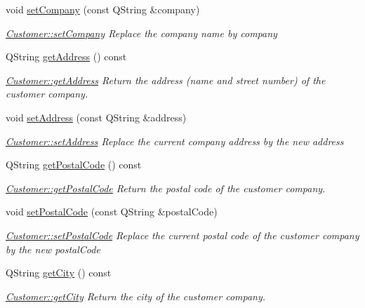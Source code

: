 \begin{DoxyCompactItemize}
void \hyperlink{classCustomer_a9d13cc3ad8464df4211da10213821fcc}{set\+Company} (const Q\+String \&company)
\begin{DoxyCompactList}\small\item\em \hyperlink{classCustomer_a9d13cc3ad8464df4211da10213821fcc}{Customer\+::set\+Company} Replace the company name by {\itshape company} \end{DoxyCompactList}\item 
Q\+String \hyperlink{classCustomer_af3e348865143342ad9c67981eb61e0c8}{get\+Address} () const 
\begin{DoxyCompactList}\small\item\em \hyperlink{classCustomer_af3e348865143342ad9c67981eb61e0c8}{Customer\+::get\+Address} Return the address (name and street number) of the customer company. \end{DoxyCompactList}\item 
void \hyperlink{classCustomer_addd0675e408a13f6ab95ec5bd5a3a13b}{set\+Address} (const Q\+String \&address)
\begin{DoxyCompactList}\small\item\em \hyperlink{classCustomer_addd0675e408a13f6ab95ec5bd5a3a13b}{Customer\+::set\+Address} Replace the current company address by the new {\itshape address} \end{DoxyCompactList}\item 
Q\+String \hyperlink{classCustomer_a39073588f2d7669b12a8ecc33b3c4224}{get\+Postal\+Code} () const 
\begin{DoxyCompactList}\small\item\em \hyperlink{classCustomer_a39073588f2d7669b12a8ecc33b3c4224}{Customer\+::get\+Postal\+Code} Return the postal code of the customer company. \end{DoxyCompactList}\item 
void \hyperlink{classCustomer_a3973123c0e94d876124cfdd0444acfd1}{set\+Postal\+Code} (const Q\+String \&postal\+Code)
\begin{DoxyCompactList}\small\item\em \hyperlink{classCustomer_a3973123c0e94d876124cfdd0444acfd1}{Customer\+::set\+Postal\+Code} Replace the current postal code of the customer company by the new {\itshape postal\+Code} \end{DoxyCompactList}\item 
Q\+String \hyperlink{classCustomer_a1eaf38d67a4ac9c8fcc675ff81f724ba}{get\+City} () const 
\begin{DoxyCompactList}\small\item\em \hyperlink{classCustomer_a1eaf38d67a4ac9c8fcc675ff81f724ba}{Customer\+::get\+City} Return the city of the customer company. \end{DoxyCompactList}\item 

\end{DoxyCompactItemize}
